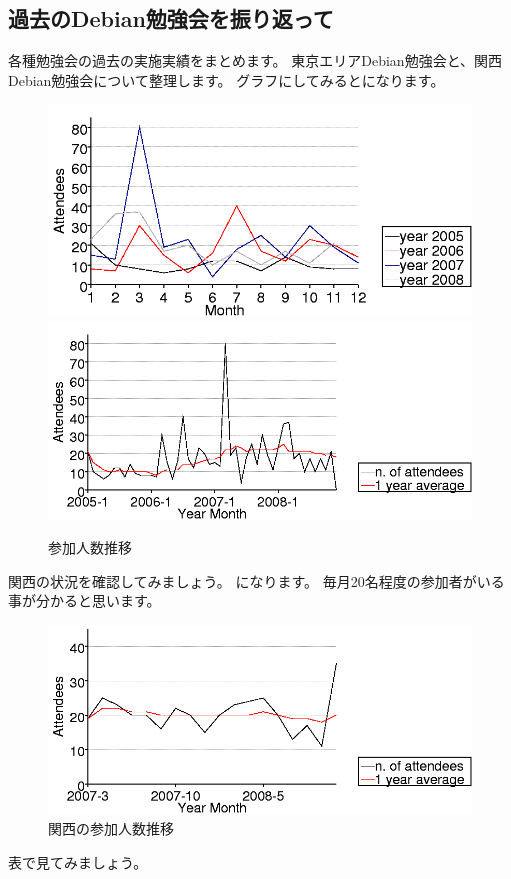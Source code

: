 \documentclass[mingoth,a4paper]{jsarticle}
\begin{document}

\subsection{過去のDebian勉強会を振り返って}

各種勉強会の過去の実施実績をまとめます。
東京エリアDebian勉強会と、関西Debian勉強会について整理します。
グラフにしてみるとになります。
\begin{figure}[h]
 \begin{center}
  \includegraphics[width=0.45\hsize]{image200812/people-chart.png}
  \includegraphics[width=0.45\hsize]{image200812/serialized.png}
 \end{center}
\caption{参加人数推移}
\label{fig:peoplechart}
\end{figure}

関西の状況を確認してみましょう。
になります。
毎月20名程度の参加者がいる事が分かると思います。

\begin{figure}[h]
 \begin{center}
  \includegraphics[width=0.45\hsize]{image200812/kansai.png}
 \end{center}
\caption{関西の参加人数推移}
\label{fig:kansaipeoplechart}
\end{figure}

表で見てみましょう。
 
\end{document}
